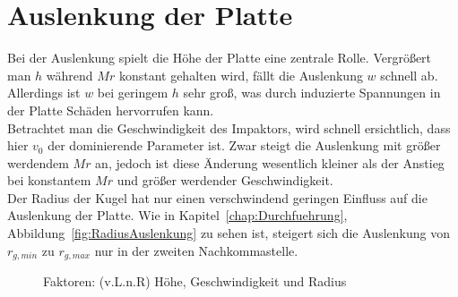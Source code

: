 \section{Auslenkung der Platte}
\label{sec:Auslenkung}

Bei der Auslenkung spielt die Höhe der Platte eine zentrale Rolle. Vergrößert man $h$ während $Mr$ konstant gehalten wird, fällt die Auslenkung $w$ schnell ab. Allerdings ist $w$ bei geringem $h$ sehr groß, was durch induzierte Spannungen in der Platte Schäden hervorrufen kann.\\
Betrachtet man die Geschwindigkeit des Impaktors, wird schnell ersichtlich, dass hier $v_{0}$ der dominierende Parameter ist. Zwar steigt die Auslenkung mit größer werdendem $Mr$ an, jedoch ist diese Änderung wesentlich kleiner als der Anstieg bei konstantem $Mr$ und größer werdender Geschwindigkeit.\\
Der Radius der Kugel hat nur einen verschwindend geringen Einfluss auf die Auslenkung der Platte. Wie in Kapitel~\ref{chap:Durchfuehrung}, Abbildung~\ref{fig:RadiusAuslenkung} zu sehen ist, steigert sich die Auslenkung von $r_{g,min}$ zu $r_{g,max}$ nur in der zweiten Nachkommastelle. \\

\begin{figure}[H]%
	\centering
	\qquad
	\caption{Faktoren: (v.L.n.R) Höhe, Geschwindigkeit und Radius}%
	\label{fig:Faktoren}%
\end{figure}

